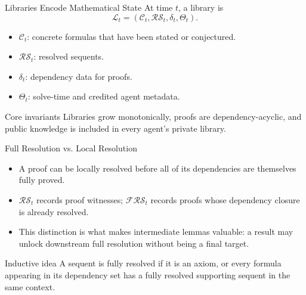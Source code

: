 \documentclass[10pt,aspectratio=169]{beamer}
\newcommand{\FRS}{\mathcal{FRS}}
\newcommand{\RS}{\mathcal{RS}}
\begin{document}
\begin{frame}{Libraries Encode Mathematical State}
\small
At time $t$, a library is
\[
\mathcal{L}_t=(\mathcal{C}_t,\mathcal{RS}_t,\delta_t,\Theta_t).
\]

\begin{itemize}
  \item $\mathcal{C}_t$: concrete formulas that have been stated or conjectured.
  \item $\mathcal{RS}_t$: resolved sequents.
  \item $\delta_t$: dependency data for proofs.
  \item $\Theta_t$: solve-time and credited agent metadata.
\end{itemize}

\vspace{0.5em}
\begin{block}{Core invariants}
Libraries grow monotonically, proofs are dependency-acyclic, and public knowledge is included in every agent's private library.
\end{block}
\end{frame}

\begin{frame}{Full Resolution vs. Local Resolution}
\small
\begin{itemize}
  \item A proof can be locally resolved before all of its dependencies are themselves fully proved.
  \item $\RS_t$ records proof witnesses; $\FRS_t$ records proofs whose dependency closure is already resolved.
  \item This distinction is what makes intermediate lemmas valuable: a result may unlock downstream full resolution without being a final target.
\end{itemize}

\begin{block}{Inductive idea}
A sequent is fully resolved if it is an axiom, or every formula appearing in its dependency set has a fully resolved supporting sequent in the same context.
\end{block}
\end{frame}
\end{document}
